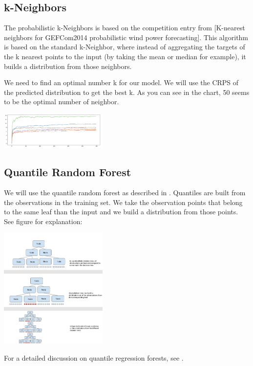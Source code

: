 \documentclass[a4paper,twocolumn,5p]{elsarticle}
\begin{document}
\subsection{k-Neighbors}

The probabilistic k-Neighbors is based on the competition entry from 
[K-nearest neighbors for GEFCom2014 probabilistic wind power forecasting]. 
This algorithm is based on the standard k-Neighbor, where instead of aggregating the targets of the
k nearest points to the input (by taking the mean or median for example), it builds a distribution 
from those neighbors.

We need to find an optimal number k for our model. We will use the CRPS of the predicted distribution
to get the best k. As you can see in the chart, 50 seems to be the optimal 
number of neighbor.

\includegraphics[width=0.4\textwidth]{kneighbor_crps}

\subsection{Quantile Random Forest}

We will use the quantile random forest as described in \cite{randomforestdesc}. Quantiles are built 
from the observations in the training set. We take the observation points that belong to the 
same leaf than the input and we build a distribution from those points. See figure for explanation:

\includegraphics[width=0.4\textwidth]{quantile_random_forest}

For a detailed discussion on quantile regression forests, see
\cite{meinshausen_quantile_2006}.
\end{document}
